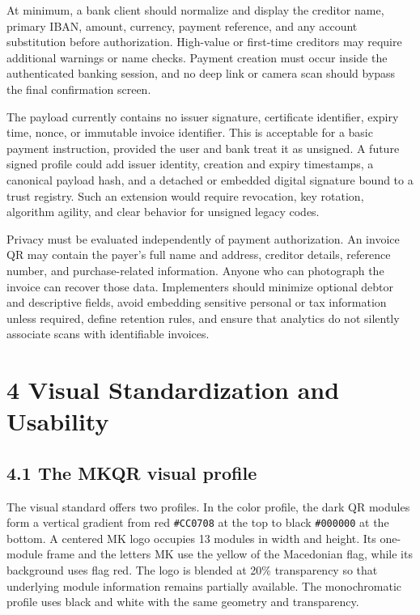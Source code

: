 At minimum, a bank client should normalize and display the creditor name, primary IBAN, amount, currency, payment reference, and any account substitution before authorization. High-value or first-time creditors may require additional warnings or name checks. Payment creation must occur inside the authenticated banking session, and no deep link or camera scan should bypass the final confirmation screen.

The payload currently contains no issuer signature, certificate identifier, expiry time, nonce, or immutable invoice identifier. This is acceptable for a basic payment instruction, provided the user and bank treat it as unsigned. A future signed profile could add issuer identity, creation and expiry timestamps, a canonical payload hash, and a detached or embedded digital signature bound to a trust registry. Such an extension would require revocation, key rotation, algorithm agility, and clear behavior for unsigned legacy codes.

Privacy must be evaluated independently of payment authorization. An invoice QR may contain the payer's full name and address, creditor details, reference number, and purchase-related information. Anyone who can photograph the invoice can recover those data. Implementers should minimize optional debtor and descriptive fields, avoid embedding sensitive personal or tax information unless required, define retention rules, and ensure that analytics do not silently associate scans with identifiable invoices.

\section{4 Visual Standardization and Usability}

\subsection{4.1 The MKQR visual profile}

The visual standard offers two profiles. In the color profile, the dark QR modules form a vertical gradient from red \texttt{\#CC0708} at the top to black \texttt{\#000000} at the bottom. A centered MK logo occupies 13 modules in width and height. Its one-module frame and the letters MK use the yellow of the Macedonian flag, while its background uses flag red. The logo is blended at 20\% transparency so that underlying module information remains partially available. The monochromatic profile uses black and white with the same geometry and transparency.


